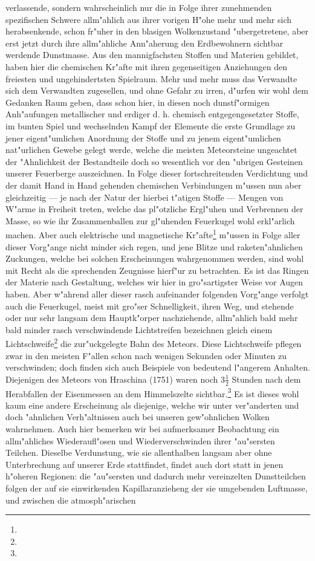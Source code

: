 \documentclass[a4paper, 8pt, oneside, polutonikogreek, german]{article}
\begin{document}
verlassende, sondern wahrscheinlich nur die in Folge ihrer zunehmenden spezifischen Schwere allm"ahlich aus ihrer vorigen H"ohe mehr und mehr sich herabsenkende, schon fr"uher in den blasigen Wolkenzustand "ubergetretene, aber erst jetzt durch ihre allm"ahliche Ann"aherung den Erdbewohnern sichtbar werdende Dunstmasse. Aus den mannigfachsten Stoffen und Materien gebildet, haben hier die chemischen Kr"afte mit ihren gegenseitigen Anziehungen den freiesten und ungehindertsten Spielraum. Mehr und mehr muss das Verwandte sich dem Verwandten zugesellen, und ohne Gefahr zu irren, d"urfen wir wohl dem Gedanken Raum geben, dass schon hier, in diesen noch dunstf"ormigen Anh"aufungen metallischer und erdiger d. h. chemisch entgegengesetzter Stoffe, im bunten Spiel und wechselnden Kampf der Elemente die erste Grundlage zu jener eigent"umlichen Anordnung der Stoffe und zu jenem eigent"umlichen nat"urlichen Gewebe gelegt werde, welche die meisten Meteorsteine ungeachtet der "Ahnlichkeit der Bestandteile doch so wesentlich vor den "ubrigen Gesteinen unserer Feuerberge auszeichnen. In Folge dieser fortschreitenden Verdichtung und der damit Hand in Hand gehenden chemischen Verbindungen m"ussen nun aber gleichzeitig --- je nach der Natur der hierbei t"atigen Stoffe --- Mengen von W"arme in Freiheit treten, welche das pl"otzliche Ergl"uhen und Verbrennen der Masse, so wie ihr Zusammenballen zur gl"uhenden Feuerkugel wohl erkl"arlich machen. Aber auch elektrische und magnetische Kr"afte\footnote{} m"ussen in Folge aller dieser Vorg"ange nicht minder sich regen, und jene Blitze und raketen"ahnlichen Zuckungen, welche bei solchen Erscheinungen wahrgenommen werden, sind wohl mit Recht als die sprechenden Zeugnisse hierf"ur zu betrachten. Es ist das Ringen der Materie nach Gestaltung, welches wir hier in gro"sartigster Weise vor Augen haben. Aber w"ahrend aller dieser rasch aufeinander folgenden Vorg"ange verfolgt auch die Feuerkugel, meist mit gro"ser Schnelligkeit, ihren Weg, und stehende oder nur sehr langsam dem Hauptk"orper nachziehende, allm"ahlich bald mehr bald minder rasch verschwindende Lichtstreifen bezeichnen gleich einem Lichtschweife\footnote{} die zur"uckgelegte Bahn des Meteors. Diese Lichtschweife pflegen zwar in den meisten F"allen schon nach wenigen Sekunden oder Minuten zu verschwinden; doch finden sich auch Beispiele von bedeutend l"angerem Anhalten. Diejenigen des Meteors von Hraschina (1751) waren noch $3\frac{1}{2}$ Stunden nach dem Herabfallen der Eisenmessen an dem Himmelszelte sichtbar.\footnote{} Es ist dieses wohl kaum eine andere Erscheinung als diejenige, welche wir unter ver"anderten und doch "ahnlichen Verh"altnissen auch bei unseren gew"ohnlichen Wolken wahrnehmen. Auch hier bemerken wir bei aufmerksamer Beobachtung ein allm"ahliches Wiederaufl"osen und Wiederverschwinden ihrer "au"sersten Teilchen. Dieselbe Verdunstung, wie sie allenthalben langsam aber ohne Unterbrechung auf unserer Erde stattfindet, findet auch dort statt in jenen h"oheren Regionen: die "au"sersten und dadurch mehr vereinzelten Dunstteilchen folgen der auf sie einwirkenden Kapillaranzieheng der sie umgebenden Luftmasse, und zwischen die atmosph"arischen 
\end{document}
